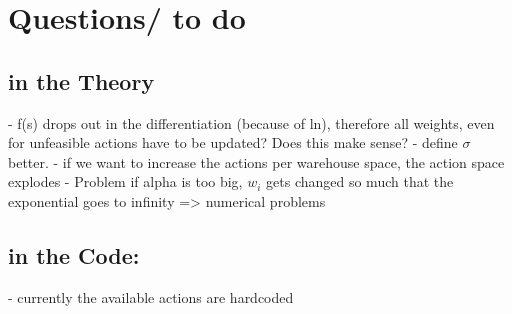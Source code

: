 \documentclass{article}
\begin{document}
\section{Questions/ to do}
\subsection{in the Theory}
- f(s) drops out in the differentiation (because of ln), therefore all weights, even for unfeasible actions have to be updated? Does this make sense? \newline
- define $\sigma$ better.
- if we want to increase the actions per warehouse space, the action space explodes
- Problem if alpha is too big, $w_i$ gets changed so much that the exponential goes to infinity  => numerical problems
\subsection{in the Code:}
- currently the available actions are hardcoded
\end{document}
